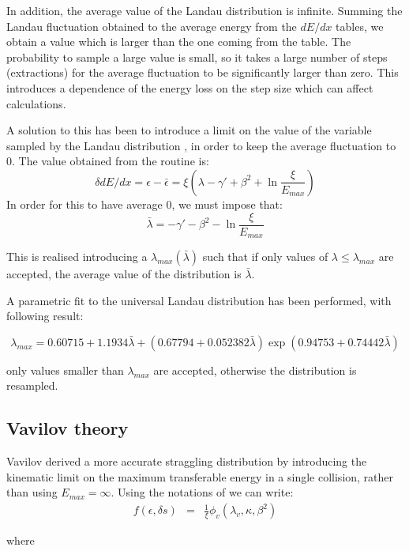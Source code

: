 In addition, the average value of the Landau distribution
is infinite. Summing the Landau fluctuation
obtained to the average energy from the $dE/dx$ tables, we
obtain a value which is larger than the one coming from the table.
The probability to sample a large value is small, so it takes a
large number of steps (extractions) for the average fluctuation to
be significantly larger than zero. This introduces a dependence of the
energy loss on the step size which can affect calculations.

A solution to this has been to introduce a limit on the value of the
variable sampled by the Landau distribution \cite{bib-JONE},
in order to keep the
average fluctuation to 0. The value obtained from the 
routine is:
\[
\delta dE/dx = \epsilon - \bar{\epsilon} = \xi ( \lambda - \gamma'
+\beta^2 +\ln \frac{\xi}{E_{max}})
\]
In order for this to have average 0, we must impose that:
\[
\bar{\lambda} = -\gamma' - \beta^2 -\ln \frac{\xi}{E_{max}}
\]

This is realised introducing a $\lambda_{max}(\bar{\lambda})$ such that
if only values of $\lambda \leq \lambda_{max}$ are accepted, the average
value of the distribution is $\bar{\lambda}$.

A parametric fit to the universal Landau distribution has been performed,
with following result:

\[
\lambda_{max} = 0.60715 + 1.1934\bar{\lambda}+(0.67794+0.052382\bar{\lambda})
\exp(0.94753+0.74442\bar{\lambda})
\]

only values smaller than $\lambda_{max}$ are accepted, otherwise the
distribution is resampled.



\subsection{Vavilov theory}
\label{vavref}
Vavilov \cite{bib-VAVI} derived a more accurate straggling
distribution by introducing the kinematic limit on the maximum
transferable energy in a single collision, rather than using
$ E_{max} = \infty $. Using the notations of \cite{bib-SCH1} we can write:
\begin{eqnarray*}
f \left ( \epsilon, \delta s \right ) & = & \frac{1}{\xi} \phi_{v}
\left ( \lambda_{v}, \kappa, \beta^{2} \right )
\end{eqnarray*}
 
where
 
